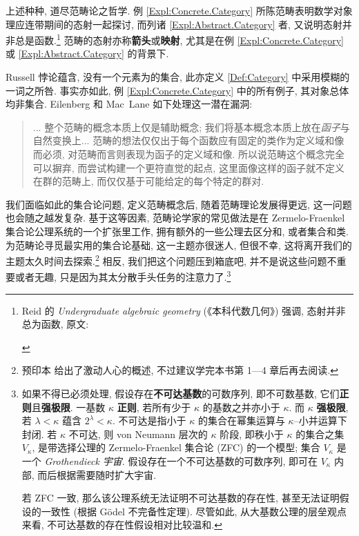 \par 上述种种, 道尽范畴论之哲学. 例 \ref{Expl:Concrete.Category} 所陈范畴表明数学对象理应连带期间的态射一起探讨, 而列诸 \ref{Expl:Abstract.Category} 者, 又说明态射并非总是函数.\footnote{Reid 的 \textit{Undergraduate algebraic geometry} (《本科代数几何》) 强调, 态射并非总为函数, 原文\cite{Rei88}:\begin{quote}
\end{quote}} 范畴的态射亦称\textbf{箭头}或\textbf{映射}, 尤其是在例 \ref{Expl:Concrete.Category} 或 \ref{Expl:Abstract.Category} 的背景下.
\begin{remark}
    Russell 悖论蕴含, 没有一个元素为的集合, 此亦定义 \ref{Def:Category} 中采用模糊的一词之所咎. 事实亦如此, 例 \ref{Expl:Concrete.Category} 中的所有例子, 其对象总体均非集合. Eilenberg 和 Mac~Lane 如下处理这一潜在漏洞:
        \begin{quote}
            ... 整个范畴的概念本质上仅是辅助概念; 我们将基本概念本质上放在\textit{函子}与自然变换上... 范畴的想法仅仅出于每个函数应有固定的类作为定义域和像而必须, 对范畴而言则表现为函子的定义域和像. 所以说范畴这个概念完全可以摒弃, 而尝试构建一个更符直觉的起点, 这里面像\squarebrace{\(\Hom\)}这样的函子就不定义在群的范畴上,  而仅仅基于可能给定的每个特定的群对. \cite{EM45}
        \end{quote}
    我们面临如此的集合论问题, 定义范畴概念后, 随着范畴理论发展得更远, 这一问题也会随之越发复杂. 基于这等因素, 范畴论学家的常见做法是在 Zermelo-Fraenkel 集合论公理系统的一个扩张里工作, 拥有额外的一些公理去区分和, 或者集合和类. 为范畴论寻觅最实用的集合论基础, 这一主题亦很迷人, 但很不幸, 这将离开我们的主题太久时间去探索.\footnote{预印本 \cite{Shu08} 给出了激动人心的概述, 不过建议学完本书第 1---4 章后再去阅读.} 相反, 我们把这个问题压到箱底吧, 并不是说这些问题不重要或者无趣, 只是因为其太分散手头任务的注意力了.\footnote{如果不得已必须处理, 假设存在\textbf{不可达基数}的可数序列, 即不可数基数, 它们\textbf{正则}且\textbf{强极限}. 一基数 \(\kappa\) \textbf{正则}, 若所有少于 \(\kappa\) 的基数之并亦小于 \(\kappa\). 而 \(\kappa\) \textbf{强极限}, 若 \(\lambda<\kappa\) 蕴含 \(2^\lambda<\kappa\). 不可达是指小于 \(\kappa\) 的集合在幂集运算与 \(\kappa\)--小并运算下封闭. 若 \(\kappa\) 不可达, 则 von Neumann 层次的 \(\kappa\) 阶段, 即秩小于 \(\kappa\) 的集合之集 \(V_\kappa\), 是带选择公理的 Zermelo-Fraenkel 集合论 (ZFC) 的一个模型; 集合 \(V_\kappa\) 是一个 \textit{Grothendieck 宇宙}. 假设存在一个不可达基数的可数序列, 即可在 \(V_\kappa\) 内部, 而后根据需要随时扩大宇宙.
    \par 若 ZFC 一致, 那么该公理系统无法证明不可达基数的存在性, 甚至无法证明假设的一致性 (根据 G\"odel 不完备性定理). 尽管如此, 从大基数公理的层垒观点来看, 不可达基数的存在性假设相对比较温和.}
\end{remark}
